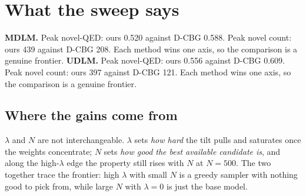 \documentclass[11pt]{article}
\begin{document}
\section{What the sweep says}
\textbf{MDLM.} Peak novel-QED: ours 0.520 against D-CBG 0.588. Peak novel count: ours 439 against D-CBG 208. Each method wins one axis, so the comparison is a genuine frontier.
\textbf{UDLM.} Peak novel-QED: ours 0.556 against D-CBG 0.609. Peak novel count: ours 397 against D-CBG 121. Each method wins one axis, so the comparison is a genuine frontier.

\subsection{Where the gains come from}

$\lambda$ and $N$ are not interchangeable. $\lambda$ sets \emph{how hard} the
tilt pulls and saturates once the weights concentrate; $N$ sets \emph{how good
the best available candidate is}, and along the high-$\lambda$ edge the property
still rises with $N$ at $N=500$. The two together trace the frontier: high
$\lambda$ with small $N$ is a greedy sampler with nothing good to pick from,
while large $N$ with $\lambda=0$ is just the base model.
\end{document}
